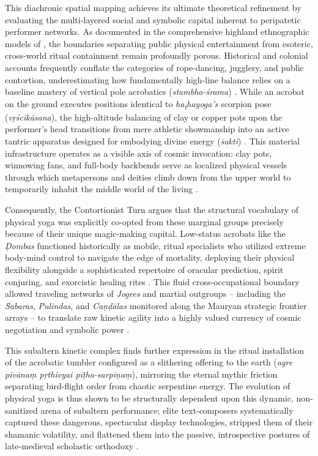\documentclass[11pt,twoside,letterpaper]{article}
\begin{document}
This diachronic spatial mapping achieves its ultimate theoretical refinement by evaluating the multi-layered social and symbolic capital inherent to peripatetic performer networks. As documented in the comprehensive highland ethnographic models of \citet{Berger2023}, the boundaries separating public physical entertainment from esoteric, cross-world ritual containment remain profoundly porous. Historical and colonial accounts frequently conflate the categories of rope-dancing, jugglery, and public contortion, underestimating how fundamentally high-line balance relies on a baseline mastery of vertical pole acrobatics (\textit{stambha-śrama}) \citep{Berger2023}. While an acrobat on the ground executes positions identical to \textit{ha\textsubscript{t}hayoga's} scorpion pose (\textit{vṛścikāsana}), the high-altitude balancing of clay or copper pots upon the performer’s head transitions from mere athletic showmanship into an active tantric apparatus designed for embodying divine energy (\textit{s̄akti}) \citep{Berger2023}. This material infrastructure operates as a visible axis of cosmic invocation: clay pots, winnowing fans, and full-body backbends serve as localized physical vessels through which metapersons and deities climb down from the upper world to temporarily inhabit the middle world of the living \citep[397]{Berger2023}. 

Consequently, the Contortionist Turn argues that the structural vocabulary of physical yoga was explicitly co-opted from these marginal groups precisely because of their unique magic-making capital. Low-status acrobats like the \textit{Ḍombas} functioned historically as mobile, ritual specialists who utilized extreme body-mind control to navigate the edge of mortality, deploying their physical flexibility alongside a sophisticated repertoire of oracular prediction, spirit conjuring, and exorcistic healing rites \citep{Berger2023, Olivelle2011}. This fluid cross-occupational boundary allowed traveling networks of \textit{Jogees} and martial outgroups -- including the \textit{S̄abaras}, \textit{Pulindas}, and \textit{Caṇḍālas} monitored along the Mauryan strategic frontier arrays -- to translate raw kinetic agility into a highly valued currency of cosmic negotiation and symbolic power \citep{Kangle1969}. 

This subaltern kinetic complex finds further expression in the ritual installation of the acrobatic tumbler configured as a slithering offering to the earth (\textit{agre pīvānaṃ pṛthivyai pīṭha-sarpiṇaṃ}), mirroring the eternal mythic friction separating bird-flight order from chaotic serpentine energy. The evolution of physical yoga is thus shown to be structurally dependent upon this dynamic, non-sanitized arena of subaltern performance; elite text-composers systematically captured these dangerous, spectacular display technologies, stripped them of their shamanic volatility, and flattened them into the passive, introspective postures of late-medieval scholastic orthodoxy \citep{Birch2024, Mallinson2017, Wujastyk2025}.
\end{document}
